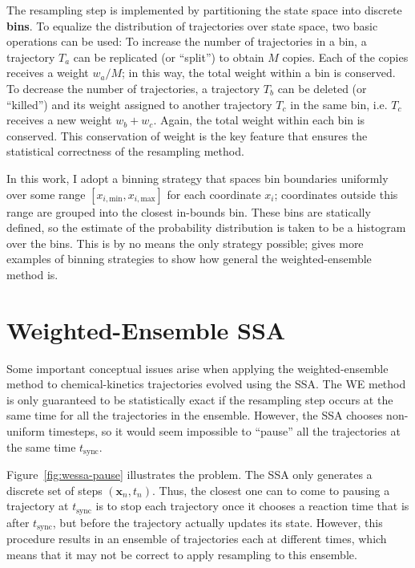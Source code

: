 \documentclass[english,letterpaper,12pt]{report}
\newcommand{\defkeywd}[1]{\textbf{#1}}
\renewcommand{\vec}[1]{\ensuremath{\mathbf{#1}}}
\begin{document}
\begin{doublespacing}
The resampling step is implemented by partitioning the state space into discrete \defkeywd{bins}. To equalize the distribution of trajectories over state space, two basic operations can be used: To increase the number of trajectories in a bin, a trajectory $T_a$ can be replicated (or ``split'') to obtain $M$ copies. Each of the copies receives a weight $w_a/M$; in this way, the total weight within a bin is conserved. To decrease the number of trajectories, a trajectory $T_b$ can be deleted (or ``killed'') and its weight assigned to another trajectory $T_c$ in the same bin, i.e. $T_c$ receives a new weight $w_b + w_c$. Again, the total weight within each bin is conserved. This conservation of weight is the key feature that ensures the statistical correctness of the resampling method.

In this work, I adopt a binning strategy that spaces bin boundaries uniformly over some range $[x_{i,\text{min}}, x_{i,\text{max}}]$ for each coordinate $x_i$; coordinates outside this range are grouped into the closest in-bounds bin. These bins are statically defined, so the estimate of the probability distribution is taken to be a histogram over the bins. This is by no means the only strategy possible; \cite{we-exact} gives more examples of binning strategies to show how general the weighted-ensemble method is.


\section{Weighted-Ensemble SSA} %
\label{sub:wessa}

Some important conceptual issues arise when applying the weighted-ensemble method to chemical-kinetics trajectories evolved using the SSA. The WE method is only guaranteed to be statistically exact if the resampling step occurs at the same time for all the trajectories in the ensemble. However, the SSA chooses non-uniform timesteps, so it would seem impossible to ``pause'' all the trajectories at the same time $t_\text{sync}$. 

Figure~\ref{fig:wessa-pause} illustrates the problem. The SSA only generates a discrete set of steps $(\vec{x}_n, t_n)$. Thus, the closest one can to come to pausing a trajectory at $t_\text{sync}$ is to stop each trajectory once it chooses a reaction time that is after $t_\text{sync}$, but before the trajectory actually updates its state. However, this procedure results in an ensemble of trajectories each at different times, which means that it may not be correct to apply resampling to this ensemble.


\end{doublespacing}
\end{document}
